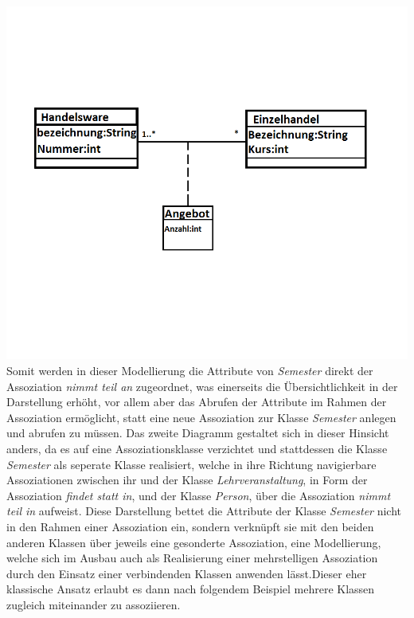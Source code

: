 \documentclass{swp1}
\begin{document}
\newline
\includegraphics[scale=0.5]{Assoziationsklasse}
\newline
Somit werden in dieser Modellierung die Attribute von \emph{Semester} direkt der Assoziation \emph{nimmt teil an} zugeordnet, was einerseits die Übersichtlichkeit in der Darstellung erhöht, vor allem aber das Abrufen der Attribute im Rahmen der Assoziation ermöglicht, statt eine neue Assoziation zur Klasse \emph{Semester} anlegen und abrufen zu müssen.\newline
\newline
Das zweite Diagramm gestaltet sich in dieser Hinsicht anders, da es auf eine Assoziationsklasse verzichtet und stattdessen die Klasse \emph{Semester} als seperate Klasse realisiert, welche in ihre Richtung navigierbare Assoziationen zwischen ihr und der Klasse \emph{Lehrveranstaltung}, in Form der Assoziation \emph{findet statt in}, und der Klasse \emph{Person}, über die Assoziation \emph{nimmt teil in} aufweist.\newline
Diese Darstellung bettet die Attribute der Klasse \emph{Semester} nicht in den Rahmen einer Assoziation ein, sondern verknüpft sie mit den beiden anderen Klassen über jeweils eine gesonderte Assoziation, eine Modellierung, welche sich im Ausbau auch als Realisierung einer mehrstelligen Assoziation durch den Einsatz einer verbindenden Klassen anwenden lässt.Dieser eher klassische Ansatz erlaubt es dann nach folgendem Beispiel mehrere Klassen zugleich miteinander zu assoziieren.\newline
\end{document}
